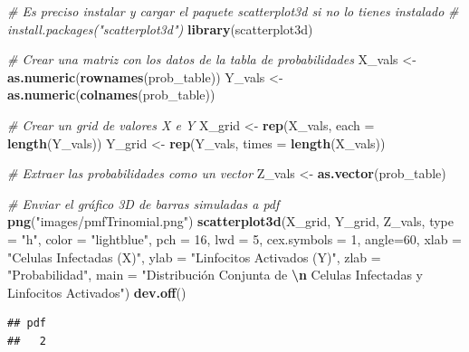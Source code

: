 \documentclass[
]{article}
\newenvironment{Shaded}{\begin{snugshade}}{\end{snugshade}}
\newcommand{\AttributeTok}[1]{\textcolor[rgb]{0.13,0.29,0.53}{#1}}
\newcommand{\CommentTok}[1]{\textcolor[rgb]{0.56,0.35,0.01}{\textit{#1}}}
\newcommand{\DecValTok}[1]{\textcolor[rgb]{0.00,0.00,0.81}{#1}}
\newcommand{\FunctionTok}[1]{\textcolor[rgb]{0.13,0.29,0.53}{\textbf{#1}}}
\newcommand{\NormalTok}[1]{#1}
\newcommand{\OtherTok}[1]{\textcolor[rgb]{0.56,0.35,0.01}{#1}}
\newcommand{\SpecialCharTok}[1]{\textcolor[rgb]{0.81,0.36,0.00}{\textbf{#1}}}
\newcommand{\StringTok}[1]{\textcolor[rgb]{0.31,0.60,0.02}{#1}}
\begin{document}
\begin{Shaded}
\begin{Highlighting}[]
\CommentTok{\# Es preciso instalar y cargar el paquete scatterplot3d si no lo tienes instalado}
\CommentTok{\# install.packages("scatterplot3d")}
\FunctionTok{library}\NormalTok{(scatterplot3d)}

\CommentTok{\# Crear una matriz con los datos de la tabla de probabilidades}
\NormalTok{X\_vals }\OtherTok{\textless{}{-}} \FunctionTok{as.numeric}\NormalTok{(}\FunctionTok{rownames}\NormalTok{(prob\_table))}
\NormalTok{Y\_vals }\OtherTok{\textless{}{-}} \FunctionTok{as.numeric}\NormalTok{(}\FunctionTok{colnames}\NormalTok{(prob\_table))}

\CommentTok{\# Crear un grid de valores X e Y}
\NormalTok{X\_grid }\OtherTok{\textless{}{-}} \FunctionTok{rep}\NormalTok{(X\_vals, }\AttributeTok{each =} \FunctionTok{length}\NormalTok{(Y\_vals))}
\NormalTok{Y\_grid }\OtherTok{\textless{}{-}} \FunctionTok{rep}\NormalTok{(Y\_vals, }\AttributeTok{times =} \FunctionTok{length}\NormalTok{(X\_vals))}

\CommentTok{\# Extraer las probabilidades como un vector}
\NormalTok{Z\_vals }\OtherTok{\textless{}{-}} \FunctionTok{as.vector}\NormalTok{(prob\_table)}

\CommentTok{\# Enviar el gráfico 3D de barras simuladas a pdf}
\FunctionTok{png}\NormalTok{(}\StringTok{"images/pmfTrinomial.png"}\NormalTok{)}
\FunctionTok{scatterplot3d}\NormalTok{(X\_grid, Y\_grid, Z\_vals,}
                     \AttributeTok{type =} \StringTok{"h"}\NormalTok{, }\AttributeTok{color =} \StringTok{"lightblue"}\NormalTok{, }
                     \AttributeTok{pch =} \DecValTok{16}\NormalTok{, }\AttributeTok{lwd =} \DecValTok{5}\NormalTok{, }
                     \AttributeTok{cex.symbols =} \DecValTok{1}\NormalTok{,}
                     \AttributeTok{angle=}\DecValTok{60}\NormalTok{,}
                     \AttributeTok{xlab =} \StringTok{"Celulas Infectadas (X)"}\NormalTok{, }
                     \AttributeTok{ylab =} \StringTok{"Linfocitos Activados (Y)"}\NormalTok{, }
                     \AttributeTok{zlab =} \StringTok{"Probabilidad"}\NormalTok{,}
                     \AttributeTok{main =} \StringTok{"Distribución Conjunta de }\SpecialCharTok{\textbackslash{}n}\StringTok{ Celulas Infectadas y Linfocitos Activados"}\NormalTok{)}
\FunctionTok{dev.off}\NormalTok{()}
\end{Highlighting}
\end{Shaded}

\begin{verbatim}
## pdf 
##   2
\end{verbatim}
\end{document}
